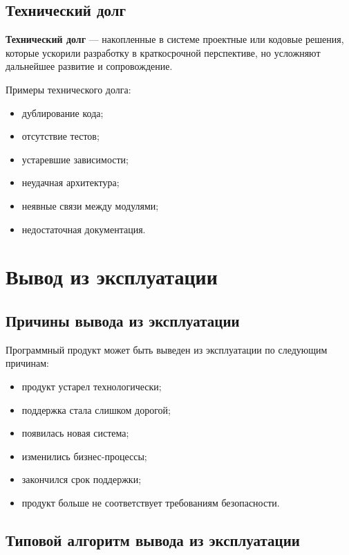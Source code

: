 \documentclass[12pt,a4paper]{article}
\begin{document}
\subsection{Технический долг}

\textbf{Технический долг} --- накопленные в системе проектные или кодовые решения, которые ускорили разработку в краткосрочной перспективе, но усложняют дальнейшее развитие и сопровождение.

Примеры технического долга:
\begin{itemize}
    \item дублирование кода;
    \item отсутствие тестов;
    \item устаревшие зависимости;
    \item неудачная архитектура;
    \item неявные связи между модулями;
    \item недостаточная документация.
\end{itemize}

\section{Вывод из эксплуатации}

\subsection{Причины вывода из эксплуатации}

Программный продукт может быть выведен из эксплуатации по следующим причинам:
\begin{itemize}
    \item продукт устарел технологически;
    \item поддержка стала слишком дорогой;
    \item появилась новая система;
    \item изменились бизнес-процессы;
    \item закончился срок поддержки;
    \item продукт больше не соответствует требованиям безопасности.
\end{itemize}

\subsection{Типовой алгоритм вывода из эксплуатации}
\end{document}
